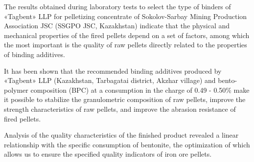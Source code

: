 The results obtained during laboratory tests to select the type of
binders of «Tagbent» LLP for pelletizing concentrate of Sokolov-Sarbay
Mining Production Association JSC (SSGPO JSC, Kazakhstan) indicate that
the physical and mechanical properties of the fired pellets depend on a
set of factors, among which the most important is the quality of raw
pellets directly related to the properties of binding additives.

It has been shown that the recommended binding additives produced by
«Tagbent» LLP (Kazakhstan, Tarbagatai district, Akzhar village) and
bento-polymer composition (BPC) at a consumption in the charge of 0.49 -
0.50\% make it possible to stabilize the granulometric composition of
raw pellets, improve the strength characteristics of raw pellets, and
improve the abrasion resistance of fired pellets.

Analysis of the quality characteristics of the finished product revealed
a linear relationship with the specific consumption of bentonite, the
optimization of which allows us to ensure the specified quality
indicators of iron ore pellets.


